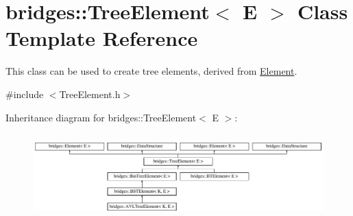 \hypertarget{classbridges_1_1_tree_element}{}\section{bridges\+:\+:Tree\+Element$<$ E $>$ Class Template Reference}
\label{classbridges_1_1_tree_element}


This class can be used to create tree elements, derived from \hyperlink{classbridges_1_1_element}{Element}.  




{\ttfamily \#include $<$Tree\+Element.\+h$>$}

Inheritance diagram for bridges\+:\+:Tree\+Element$<$ E $>$\+:\begin{figure}[H]
\begin{center}
\leavevmode
\includegraphics[height=3.301887cm]{classbridges_1_1_tree_element}
\end{center}
\end{figure}
